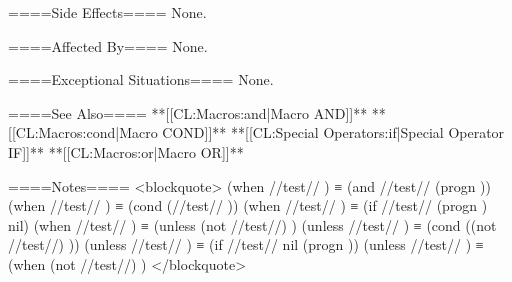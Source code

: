 ====Side Effects====
None.

====Affected By====
None.

====Exceptional Situations====
None.

====See Also====
**[[CL:Macros:and|Macro AND]]**
**[[CL:Macros:cond|Macro COND]]**
**[[CL:Special Operators:if|Special Operator IF]]**
**[[CL:Macros:or|Macro OR]]**

====Notes====
<blockquote>
(when //test// ) ≡ (and //test// (progn )) 
(when //test// ) ≡ (cond (//test// )) 
(when //test// ) ≡ (if //test// (progn ) nil) 
(when //test// ) ≡ (unless (not //test//) ) 
(unless //test// ) ≡ (cond ((not //test//) )) 
(unless //test// ) ≡ (if //test// nil (progn )) 
(unless //test// ) ≡ (when (not //test//) )
</blockquote>

